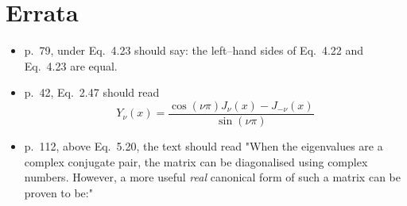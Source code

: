 \chapter*{Errata}

\begin{itemize}

\item p.~79, under Eq.~4.23 should say: the left--hand sides of Eq.~4.22 and Eq.~4.23 are equal.

\item p.~42, Eq.~2.47 should read $$Y_\nu(x) = \frac{\cos(\nu \pi)J_\nu(x) - J_{-\nu}(x)}{\sin(\nu \pi)}$$

\item p.~112, above Eq.~5.20, the text should read
"When the eigenvalues are a complex conjugate pair, the matrix can be diagonalised using complex numbers. However, a more useful \emph{real} canonical form of such a matrix can be proven to be:"

\end{itemize}